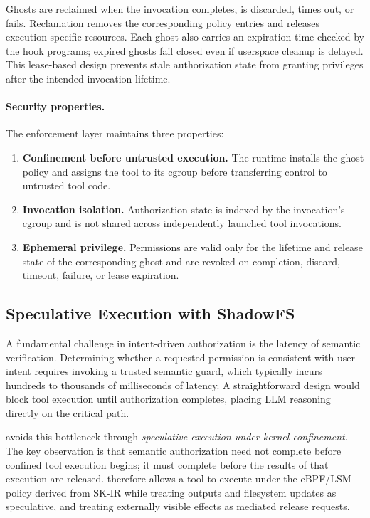 Ghosts are reclaimed when the invocation completes, is discarded, times out, or
fails. Reclamation removes the corresponding policy entries and releases
execution-specific resources. Each ghost also carries an expiration time checked
by the hook programs; expired ghosts fail closed even if userspace cleanup is
delayed. This lease-based design prevents stale authorization state from
granting privileges after the intended invocation lifetime.

\paragraph{Security properties.}
The enforcement layer maintains three properties:

\begin{enumerate}[leftmargin=1.2em]
\item \textbf{Confinement before untrusted execution.}
The runtime installs the ghost policy and assigns the tool to its cgroup before
transferring control to untrusted tool code.

\item \textbf{Invocation isolation.}
Authorization state is indexed by the invocation's cgroup and is not shared
across independently launched tool invocations.

\item \textbf{Ephemeral privilege.}
Permissions are valid only for the lifetime and release state of the
corresponding ghost and are revoked on completion, discard, timeout, failure,
or lease expiration.
\end{enumerate}

\subsection{Speculative Execution with ShadowFS}
\label{sec:design:speculative}

A fundamental challenge in intent-driven authorization is the latency of
semantic verification. Determining whether a requested permission is consistent
with user intent requires invoking a trusted semantic guard, which typically
incurs hundreds to thousands of milliseconds of latency. A straightforward
design would block tool execution until authorization completes, placing LLM
reasoning directly on the critical path.

\SystemName avoids this bottleneck through \emph{speculative execution under
kernel confinement}. The key observation is that semantic authorization need
not complete before confined tool execution begins; it must complete before the
results of that execution are released. \SystemName therefore allows a tool to
execute under the eBPF/LSM policy derived from SK-IR while treating outputs and
filesystem updates as speculative, and treating externally visible effects as
mediated release requests.

